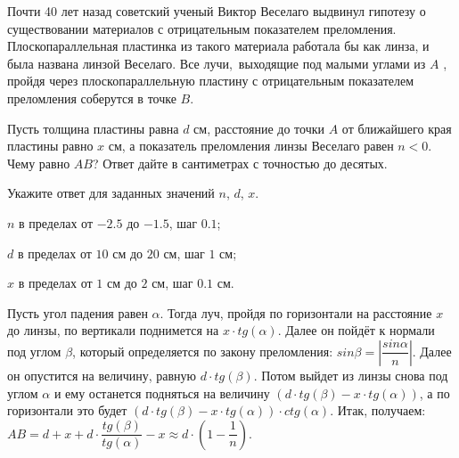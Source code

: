 
Почти 40 лет назад советский ученый
Виктор Веселаго выдвинул гипотезу о существовании материалов с отрицательным
показателем преломления. Плоскопараллельная пластинка из такого материала
работала бы как линза, и была названа линзой Веселаго. Все
лучи, выходящие под малыми углами из $A$ , пройдя через плоскопараллельную пластину с 
отрицательным показателем преломления соберутся в точке $B$.


Пусть толщина пластины равна $d$ см, расстояние до точки $A$ от ближайшего края пластины
равно $x$ см, а показатель преломления линзы Веселаго равен $n < 0$. Чему равно $AB$? Ответ
дайте в сантиметрах с точностью до десятых.

Укажите ответ для заданных значений $n$, $d$, $x$.

\paramSection

$n$ в пределах от $-2.5$ до $-1.5$, шаг $0.1$;     

$d$ в пределах от $10$ см до $20$ см, шаг $1$ см; 

$x$ в пределах от $1$ см до $2$ см, шаг $0.1$ см.

\soultionSection

Пусть угол падения равен $\alpha$. Тогда луч, пройдя по горизонтали на расстояние $x$ до линзы, по вертикали поднимется на 
$x \cdot tg(\alpha)$. Далее он пойдёт к нормали под углом $\beta$, который определяется по закону преломления: 
$sin\beta=\left|\dfrac{sin\alpha}{n}\right|$. Далее он опустится на величину, равную $d \cdot tg(\beta)$. 
Потом выйдет из линзы снова под углом $\alpha$ и ему останется подняться на величину $(d \cdot  tg(\beta) - x \cdot tg(\alpha) )$, 
а по горизонтали это будет $(d \cdot  tg(\beta) - x \cdot tg(\alpha )) \cdot ctg(\alpha )$. 
Итак, получаем:  $AB=d+x+d \cdot \dfrac{tg(\beta)}{tg(\alpha )}-x \approx d \cdot (1 - \dfrac{1}{n})$.

